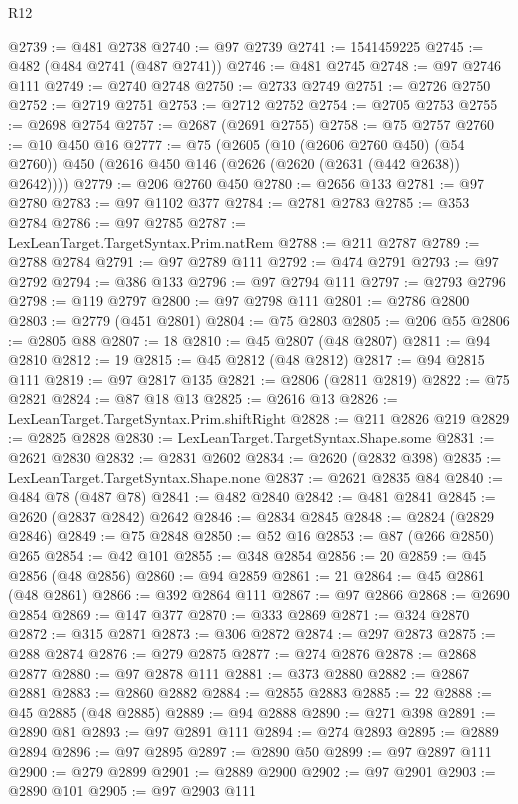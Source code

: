 \begin{lexlean}{R12}
\begin{coremodule}
@2739 := @481 @2738
@2740 := @97 @2739
@2741 := 1541459225
@2745 := @482 (@484 @2741 (@487 @2741))
@2746 := @481 @2745
@2748 := @97 @2746 @111
@2749 := @2740 @2748
@2750 := @2733 @2749
@2751 := @2726 @2750
@2752 := @2719 @2751
@2753 := @2712 @2752
@2754 := @2705 @2753
@2755 := @2698 @2754
@2757 := @2687 (@2691 @2755)
@2758 := @75 @2757
@2760 := @10 @450 @16
@2777 := @75
    (@2605
      (@10 (@2606 @2760 @450) (@54 @2760))
      @450
      (@2616 @450 @146 (@2626 (@2620 (@2631 (@442 @2638)) @2642))))
@2779 := @206 @2760 @450
@2780 := @2656 @133
@2781 := @97 @2780
@2783 := @97 @1102 @377
@2784 := @2781 @2783
@2785 := @353 @2784
@2786 := @97 @2785
@2787 := LexLeanTarget.TargetSyntax.Prim.natRem
@2788 := @211 @2787
@2789 := @2788 @2784
@2791 := @97 @2789 @111
@2792 := @474 @2791
@2793 := @97 @2792
@2794 := @386 @133
@2796 := @97 @2794 @111
@2797 := @2793 @2796
@2798 := @119 @2797
@2800 := @97 @2798 @111
@2801 := @2786 @2800
@2803 := @2779 (@451 @2801)
@2804 := @75 @2803
@2805 := @206 @55
@2806 := @2805 @88
@2807 := 18
@2810 := @45 @2807 (@48 @2807)
@2811 := @94 @2810
@2812 := 19
@2815 := @45 @2812 (@48 @2812)
@2817 := @94 @2815 @111
@2819 := @97 @2817 @135
@2821 := @2806 (@2811 @2819)
@2822 := @75 @2821
@2824 := @87 @18 @13
@2825 := @2616 @13
@2826 := LexLeanTarget.TargetSyntax.Prim.shiftRight
@2828 := @211 @2826 @219
@2829 := @2825 @2828
@2830 := LexLeanTarget.TargetSyntax.Shape.some
@2831 := @2621 @2830
@2832 := @2831 @2602
@2834 := @2620 (@2832 @398)
@2835 := LexLeanTarget.TargetSyntax.Shape.none
@2837 := @2621 @2835 @84
@2840 := @484 @78 (@487 @78)
@2841 := @482 @2840
@2842 := @481 @2841
@2845 := @2620 (@2837 @2842) @2642
@2846 := @2834 @2845
@2848 := @2824 (@2829 @2846)
@2849 := @75 @2848
@2850 := @52 @16
@2853 := @87 (@266 @2850) @265
@2854 := @42 @101
@2855 := @348 @2854
@2856 := 20
@2859 := @45 @2856 (@48 @2856)
@2860 := @94 @2859
@2861 := 21
@2864 := @45 @2861 (@48 @2861)
@2866 := @392 @2864 @111
@2867 := @97 @2866
@2868 := @2690 @2854
@2869 := @147 @377
@2870 := @333 @2869
@2871 := @324 @2870
@2872 := @315 @2871
@2873 := @306 @2872
@2874 := @297 @2873
@2875 := @288 @2874
@2876 := @279 @2875
@2877 := @274 @2876
@2878 := @2868 @2877
@2880 := @97 @2878 @111
@2881 := @373 @2880
@2882 := @2867 @2881
@2883 := @2860 @2882
@2884 := @2855 @2883
@2885 := 22
@2888 := @45 @2885 (@48 @2885)
@2889 := @94 @2888
@2890 := @271 @398
@2891 := @2890 @81
@2893 := @97 @2891 @111
@2894 := @274 @2893
@2895 := @2889 @2894
@2896 := @97 @2895
@2897 := @2890 @50
@2899 := @97 @2897 @111
@2900 := @279 @2899
@2901 := @2889 @2900
@2902 := @97 @2901
@2903 := @2890 @101
@2905 := @97 @2903 @111

\end{coremodule}
\end{lexlean}
